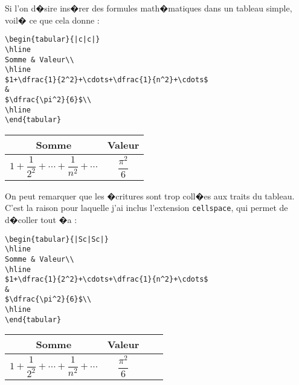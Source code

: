 \documentclass[ams,openany,10pt,presentation,latin1]{mathbook}
\begin{document}
Si l'on d�sire ins�rer des formules math�matiques dans un tableau simple, voil� ce que cela donne :

\medskip

\begin{minipage}{0.55\linewidth}
\begin{lstlisting}
\begin{tabular}{|c|c|}
\hline
Somme & Valeur\\
\hline
$1+\dfrac{1}{2^2}+\cdots+\dfrac{1}{n^2}+\cdots$
&
$\dfrac{\pi^2}{6}$\\
\hline
\end{tabular}
\end{lstlisting}
\end{minipage}
\begin{minipage}{0.4\linewidth}
\begin{center}
\begin{tabular}{|c|c|}
\hline
Somme & Valeur\\
\hline
$1+\dfrac{1}{2^2}+\cdots+\dfrac{1}{n^2}+\cdots$
&
$\dfrac{\pi^2}{6}$\\
\hline
\end{tabular}
\end{center}
\end{minipage}

On peut remarquer que les �critures sont trop coll�es aux traits du tableau. C'est la raison pour laquelle j'ai inclus l'extension \texttt{cellspace}, qui permet de \og d�coller \fg{} tout �a :

\medskip

\begin{minipage}{0.55\linewidth}
\begin{lstlisting}
\begin{tabular}{|Sc|Sc|}
\hline
Somme & Valeur\\
\hline
$1+\dfrac{1}{2^2}+\cdots+\dfrac{1}{n^2}+\cdots$
&
$\dfrac{\pi^2}{6}$\\
\hline
\end{tabular}
\end{lstlisting}
\end{minipage}
\begin{minipage}{0.4\linewidth}
\begin{center}
\begin{tabular}{|Sc|Sc|}
\hline
Somme & Valeur\\
\hline
$1+\dfrac{1}{2^2}+\cdots+\dfrac{1}{n^2}+\cdots$
&
$\dfrac{\pi^2}{6}$\\
\hline
\end{tabular}
\end{center}
\end{minipage}
\end{document}
